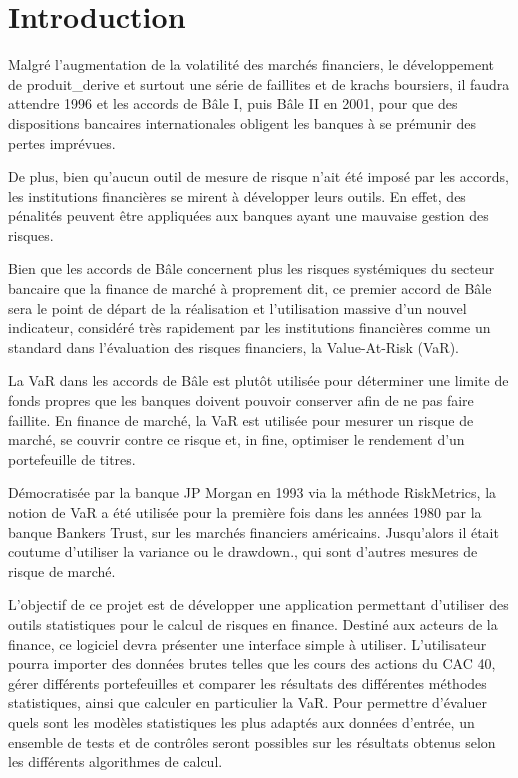 \chapter{Introduction} 
	Malgré l'augmentation de la volatilité des marchés financiers, le développement de \gls{produit_derive} et surtout une série de faillites et de krachs boursiers, il faudra attendre 1996 et les accords de Bâle I, puis Bâle II en 2001, pour que des dispositions bancaires internationales obligent les banques à se prémunir des pertes imprévues. 

De plus, bien qu'aucun outil de mesure de risque n'ait été imposé par les accords, les institutions financières se mirent à développer leurs outils. En effet, des pénalités peuvent être appliquées aux banques ayant une mauvaise gestion des risques.

Bien que les accords de Bâle concernent plus les risques systémiques du secteur bancaire que la finance de marché à proprement dit, ce premier accord de Bâle sera le point de départ de la réalisation et l'utilisation massive d'un nouvel indicateur, considéré très rapidement par les institutions financières comme un standard dans l'évaluation des risques financiers, la Value-At-Risk (VaR).

La VaR dans les accords de Bâle est plutôt utilisée pour déterminer une limite de fonds propres que les banques doivent pouvoir conserver afin de ne pas faire faillite. En finance de marché, la VaR est utilisée pour mesurer un risque de marché, se couvrir contre ce risque et, in fine, optimiser le rendement d'un portefeuille de titres.

Démocratisée par la banque JP Morgan en 1993 via la méthode RiskMetrics, la notion de VaR a été utilisée pour la première fois dans les années 1980 par la banque Bankers Trust, sur les marchés financiers américains. Jusqu'alors il était coutume d'utiliser la variance ou le \gls{drawdown}., qui sont d'autres mesures de risque de marché.

L'objectif de ce projet est de développer une application permettant d'utiliser des outils statistiques pour le calcul de risques en finance. Destiné aux acteurs de la finance, ce logiciel devra présenter une interface simple à utiliser. L'utilisateur pourra importer des données brutes telles que les cours des actions du CAC 40, gérer différents portefeuilles et comparer les résultats des différentes méthodes statistiques, ainsi que calculer en particulier la VaR. Pour permettre d'évaluer quels sont les modèles statistiques les plus adaptés aux données d'entrée, un ensemble de tests et de contrôles seront possibles sur les résultats obtenus selon les différents algorithmes de calcul.

